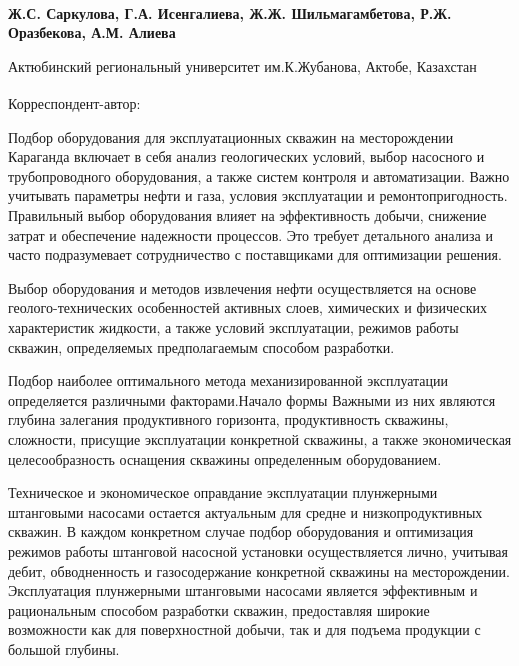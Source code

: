 
\begin{articleheader}

{\bfseries
Ж.С. Саркулова\textsuperscript{\envelope },
Г.А. Исенгалиева,
Ж.Ж. Шильмагамбетова,
Р.Ж. Оразбекова,
А.М. Алиева
}
\end{articleheader}

\begin{affiliation}
Актюбинский региональный университет им.К.Жубанова, Актобе, Казахстан

\raggedright \textsuperscript{\envelope } Корреспондент-автор: \href{mailto:zhadi_0691@mail.ru}{}
\end{affiliation}

Подбор оборудования для эксплуатационных скважин на месторождении
Караганда включает в себя анализ геологических условий, выбор насосного
и трубопроводного оборудования, а также систем контроля и автоматизации.
Важно учитывать параметры нефти и газа, условия эксплуатации и
ремонтопригодность. Правильный выбор оборудования влияет на
эффективность добычи, снижение затрат и обеспечение надежности
процессов. Это требует детального анализа и часто подразумевает
сотрудничество с поставщиками для оптимизации решения.

Выбор оборудования и методов извлечения нефти осуществляется на основе
геолого-технических особенностей активных слоев, химических и физических
характеристик жидкости, а также условий эксплуатации, режимов работы
скважин, определяемых предполагаемым способом разработки.

Подбор наиболее оптимального метода механизированной эксплуатации
определяется различными факторами.Начало формы Важными из них являются
глубина залегания продуктивного горизонта, продуктивность скважины,
сложности, присущие эксплуатации конкретной скважины, а также
экономическая целесообразность оснащения скважины определенным
оборудованием.

Техническое и экономическое оправдание эксплуатации плунжерными
штанговыми насосами остается актуальным для средне и низкопродуктивных
скважин. В каждом конкретном случае подбор оборудования и оптимизация
режимов работы штанговой насосной установки осуществляется лично,
учитывая дебит, обводненность и газосодержание конкретной скважины на
месторождении. Эксплуатация плунжерными штанговыми насосами является
эффективным и рациональным способом разработки скважин, предоставляя
широкие возможности как для поверхностной добычи, так и для подъема
продукции с большой глубины.

